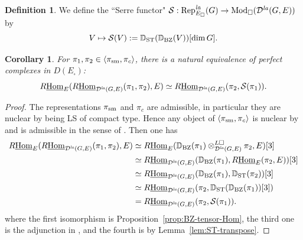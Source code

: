 \documentclass[a4paper,10pt]{amsart}
\theoremstyle{remark}
\theoremstyle{definition}
\newtheorem{definition}[theorem]{Definition}
\theoremstyle{plain}
\newtheorem{corollary}[theorem]{Corollary}
\numberwithin{equation}{section}
\newcommand{\bbD}{{\mathbb D}}
\newcommand{\calD}{{\mathcal D}}
\newcommand{\calS}{{\mathcal S}}
\newcommand{\Hom}{{\rm Hom}}
\newcommand{\uHom}{\underline{\Hom}}
\newcommand{\la}{{\it la}}
\newcommand{\Mod}{{\rm Mod}}
\newcommand{\Rep}{{\rm Rep}}
\newcommand{\sm}{{\rm sm}}
\newcommand{\ST}{{\rm ST}}
\newcommand{\BZ}{\ensuremath{\mathrm{BZ}}}
\begin{document}
\begin{definition}\label{def:serre-functor}
	We define the ``Serre functor" $\calS:\Rep^{\la}_{E_\square}(G)\to \Mod_{\square}(\calD^{\la}(G,E))$ by
	\[
	V\mapsto \calS(V):=\bbD_{\ST}(\bbD_{\BZ}(V))[\dim G].
	\]
\end{definition}
\begin{corollary}\label{cor:ST-BZ-comparison}
For $\pi_1,\pi_2\in\langle \pi_{\sm},\pi_c\rangle$, there is a natural equivalence of perfect complexes in $D(E_\square)$:
\[
 R\uHom_{E}(
 R\uHom_{\calD^{\la}(G,E)}(\pi_1,\pi_2),E)
 \simeq R\uHom_{\calD^{\la}(G,E)}
 (\pi_2,\calS(\pi_1)).
\]
\end{corollary}
\begin{proof}
	The representations $\pi_{\sm}$ and $\pi_c$ are admissible, in particular they are nuclear by \cite[Prop.~A.11]{bosco2023rationalpadicHodge} being LS of compact type. Hence any object of $\langle \pi_{\sm},\pi_c\rangle$ is nuclear by \cite[Lem.~5.40]{andreychev2021pseudocoherent} and is admissible in the sense of \cite[Def.~4.2.1]{JC23}. Then one has
\[
\begin{aligned}
 R\uHom_{E}(
 R\uHom_{\calD^{\la}(G,E)}(\pi_1,\pi_2),E)&
 \simeq R\uHom_{E}(\bbD_{\BZ}(\pi_1)\otimes_{\calD^{\la}(G,E)}^{L\square}\pi_2,E)[3]\\
 &\simeq R\uHom_{\calD^{\la}(G,E)}(\bbD_{\BZ}(\pi_1),R\uHom_E(\pi_2,E))[3]\\
 &\simeq R\uHom_{\calD^{\la}(G,E)}
 (\bbD_{\BZ}(\pi_1),\bbD_{\ST}(\pi_2))[3]\\
 &\simeq R\uHom_{\calD^{\la}(G,E)}
 (\pi_2,\bbD_{\ST}(\bbD_{\BZ}(\pi_1))[3])\\
&=R\uHom_{\calD^{\la}(G,E)}(\pi_2,\calS(\pi_1)).
\end{aligned}
\]
where the first isomorphism is Proposition~\ref{prop:BZ-tensor-Hom}, the third one is the adjunction in \cite[Cor.~3.3.7]{JC23}, and the fourth is by Lemma~\ref{lem:ST-transpose}.
\end{proof}
\end{document}

